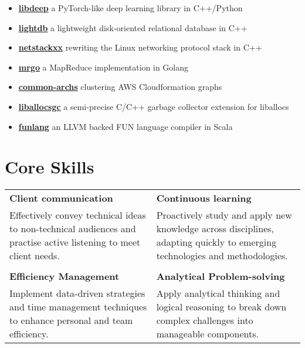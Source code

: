 \documentclass[11pt,a4paper]{article}
\begin{document}
    \begin{itemize}[leftmargin=0em]
        \item [] \href{https://github.com/muffpy/libdeep}{\textbf{libdeep}} a PyTorch-like deep learning library in C++/Python
        \item [] \href{https://github.com/muffpy/lightdb}{\textbf{lightdb}} a lightweight disk-oriented relational database in C++
        \item [] \href{https://github.com/muffpy/netstackxx}{\textbf{netstackxx}} rewriting the Linux networking protocol stack in C++
        \item [] \href{https://github.com/muffpy/mrgo}{\textbf{mrgo}} a MapReduce implementation in Golang
        \item  [] \href{https://muffpy.github.io/assets/home/commonarch_press.pdf}{\textbf{common-archs}} clustering AWS Cloudformation graphs
        \item [] \href{https://github.com/muffpy/liballocsgc}{\textbf{liballocsgc}} a semi-precise C/C++ garbage collector extension for liballocs
        \item [] \href{https://github.com/muffpy/funlang}{\textbf{funlang}} an LLVM backed FUN language compiler in Scala
    \end{itemize}

    \section{Core Skills}
    \begin{tabular}{p{} p{}}
    \textbf{Client communication} & \textbf{Continuous learning} \\
    Effectively convey technical ideas to non-technical audiences and practise active listening to meet client needs. & 
    
    Proactively study and apply new knowledge across disciplines, adapting quickly to emerging technologies and methodologies. \\ \\
    \textbf{Efficiency Management} & \textbf{Analytical Problem-solving} \\
    Implement data-driven strategies and time management techniques to enhance personal and team efficiency. & 
    
    Apply analytical thinking and logical reasoning to break down complex challenges into manageable components. \\
    \end{tabular}
    
\end{document}
